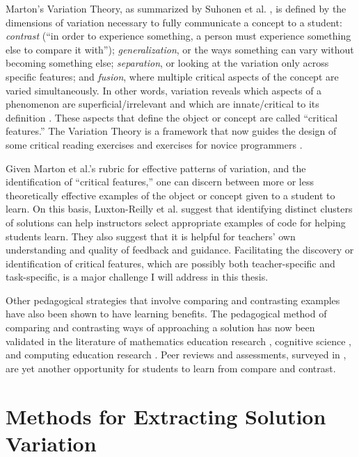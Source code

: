 Marton's Variation Theory, as summarized by Suhonen et al. \cite{suhonen}, is defined by the dimensions of variation necessary to fully communicate a concept to a student: \emph{contrast} (``in order to experience something, a person must experience something else to compare it with''); \emph{generalization}, or the ways something can vary without becoming something else; \emph{separation}, or looking at the variation only across specific features; and \emph{fusion}, where multiple critical aspects of the concept are varied simultaneously. In other words, variation reveals which aspects of a phenomenon are superficial/irrelevant and which are innate/critical to its definition \cite{Leung}. These aspects that define the object or concept are called ``critical features.'' The Variation Theory is a framework that now guides the design of some critical reading exercises \cite{Tong} and exercises for novice programmers \cite{eckerdal}. 

Given Marton et al.'s rubric for effective patterns of variation, and the identification of ``critical features,'' one can discern between more or less theoretically effective examples of the object or concept given to a student to learn. On this basis, Luxton-Reilly et al. \cite{Luxton13} suggest that identifying distinct clusters of solutions can help instructors select appropriate examples of code for helping students learn. They also suggest that it is helpful for teachers' own understanding and quality of feedback and guidance. Facilitating the discovery or identification of critical features, which are possibly both teacher-specific and task-specific, is a major challenge I will address in this thesis. 

Other pedagogical strategies that involve comparing and contrasting examples have also been shown to have learning benefits. The pedagogical method of comparing and contrasting ways of approaching a solution has now been validated in the literature of mathematics education research \cite{Star07}, cognitive science \cite{loewenstein2003analogical,kurtz01learning,telling}, and computing education research \cite{Suhonen08, PatitsasICER13}. Peer reviews and assessments, surveyed in \cite{peerReview98}, are yet another opportunity for students to learn from compare and contrast.

\section{Methods for Extracting Solution Variation}

